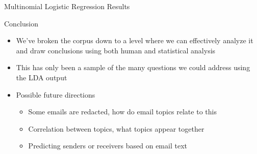 \documentclass[handout,13pt]{beamer}
\begin{document}
\begin{frame}{Multinomial Logistic Regression Results}
\begin{table}[h]
\centering
\label{multinomial_results}
\end{table}
\end{frame}


\begin{frame}{Conclusion}
\begin{itemize}
\item We've broken the corpus down to a level where we can effectively analyze it and draw conclusions using both human and statistical analysis
\item This has only been a sample of the many questions we could address using the LDA output
\item Possible future directions
  \begin{itemize}
  \item Some emails are redacted, how do email topics relate to this
  \item Correlation between topics, what topics appear together
  \item Predicting senders or receivers based on email text
  \end{itemize}
\end{itemize}
\end{frame}
\end{document}
